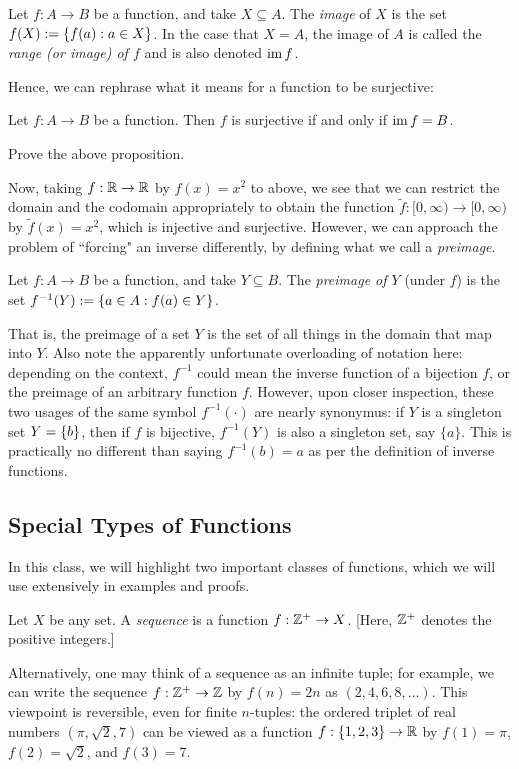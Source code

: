 \documentclass{article}
\begin{document}
 
\begin{definition}
Let $f: A\to B$ be a function, and take $X\subseteq A$. The \textit{image} of $X$ is the set $f(X) := \left\{f(a): a\in X\right\}$. In the case that $X = A$, the image of $A$ is called the \textit{range (or image) of $f$} and is also denoted $\operatorname{im} f$.
\end{definition}
Hence, we can rephrase what it means for a function to be surjective:
\begin{proposition}
Let $f: A\to B$ be a function. Then $f$ is surjective if and only if $\operatorname{im} f = B$.
\end{proposition}
\begin{exercise}
Prove the above proposition.
\end{exercise}

Now, taking $f: \mathbb R\to \mathbb R$ by $f(x) = x^2$ to above, we see that we can restrict the domain and the codomain appropriately to obtain the function $\tilde f: [0, \infty)\to [0, \infty)$ by $\tilde f(x) = x^2$, which is injective and surjective. However, we can approach the problem of ``forcing" an inverse differently, by defining what we call a \textit{preimage}.
\begin{definition}
Let $f:A\to B$ be a function, and take $Y\subseteq B$. The \textit{preimage of $Y$} (under $f$) is the set $f^{-1}(Y) := \left\{a\in A: f(a) \in Y\right\}$.
\end{definition}
That is, the preimage of a set $Y$ is the set of all things in the domain that map into $Y$. Also note the apparently unfortunate overloading of notation here: depending on the context, $f^{-1}$ could mean the inverse function of a bijection $f$, or the preimage of an arbitrary function $f$. However, upon closer inspection, these two usages of the same symbol $f^{-1}(\cdot)$ are nearly synonymus: if $Y$ is a singleton set $Y = \left\{b\right\}$, then if $f$ is bijective, $f^{-1}(Y)$ is also a singleton set, say $\{a\}$. This is practically no different than saying $f^{-1}(b) = a$ as per the definition of inverse functions.

\subsection*{Special Types of Functions}
In this class, we will highlight two important classes of functions, which we will use extensively in examples and proofs.
\begin{definition}
Let $X$ be any set. A \textit{sequence} is a function $f: \mathbb Z^+ \to X$. [Here, $\mathbb Z^+$ denotes the positive integers.]
\end{definition}
Alternatively, one may think of a sequence as an infinite tuple; for example, we can write the sequence $f: \mathbb Z^+ \to \mathbb Z$ by $f(n) = 2n$ as $(2, 4, 6, 8, \ldots)$. This viewpoint is reversible, even for finite $n$-tuples: the ordered triplet of real numbers $(\pi, \sqrt 2, 7)$ can be viewed as a function $f: \{1,2,3\}\to \mathbb R$ by $f(1) = \pi$, $f(2) = \sqrt 2$, and $f(3) = 7$.
\end{document}
